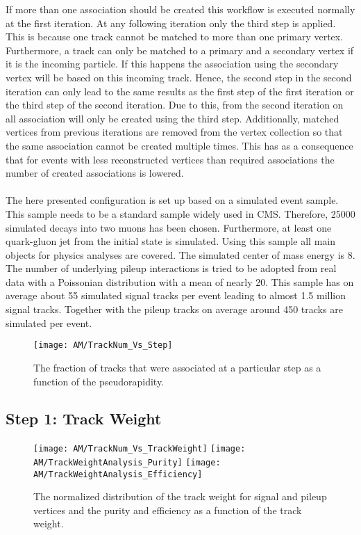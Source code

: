 If more than one association should be created this workflow is executed normally at the first iteration. At any following iteration only the third step is applied. This is because one track cannot be matched to more than one primary vertex. Furthermore, a track can only be matched to a primary and a secondary vertex if it is the incoming particle. If this happens the association using the secondary vertex will be based on this incoming track. Hence, the second step in the second iteration can only lead to the same results as the first step of the first iteration or the third step of the second iteration. Due to this, from the second iteration on all association will only be created using the third step. Additionally, matched vertices from previous iterations are removed from the vertex collection so that the same association cannot be created multiple times. This has as a consequence that for events with less reconstructed vertices than required associations the number of created associations is lowered. \\ \\
The here presented configuration is set up based on a simulated event sample. This sample needs to be a standard sample widely used in CMS. Therefore, 25000 simulated \Zz decays into two muons has been chosen. Furthermore, at least one quark-gluon jet from the initial state is simulated. Using this sample all main objects for physics analyses are covered. The simulated center of mass energy is 8\TeV. The number of underlying pileup interactions is tried to be adopted from real data with a Poissonian distribution with a mean of nearly 20. This sample has on average about 55 simulated signal tracks per event leading to almost 1.5 million signal tracks. Together with the pileup tracks on average around 450 tracks are simulated per event.

\begin{figure}[!ht]
  \centering
  \texttt{[image: AM/TrackNum\_Vs\_Step]}
  \caption[Plot of the fraction of tracks to be associated at which step]{The fraction of tracks that were associated at a particular step as a function of the pseudorapidity.\label{plot:AMTrackStepFrac}}
\end{figure}

\subsection{Step 1: Track Weight \label{sec:AMWFTW}}

\begin{figure}[!ht]
  \centering
  \texttt{[image: AM/TrackNum\_Vs\_TrackWeight]}
  \texttt{[image: AM/TrackWeightAnalysis\_Purity]}
  \texttt{[image: AM/TrackWeightAnalysis\_Efficiency]}
  \caption[Distribution of the track weight and purity and efficiency vs track weight]{The normalized distribution of the track weight for signal and pileup vertices and the purity and efficiency as a function of the track weight.\label{plot:AMTWdistpureff}}
\end{figure}

